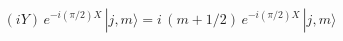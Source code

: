 \begin{equation}
\left( iY\right) \,e^{-i({\pi}/{2})X}\,|j,m\rangle=i\,(m+{1}/{2} )\,
	e^{-i({\pi}/{2})X}  \,|j,m\rangle 
\label{eq:la}
\end{equation}

